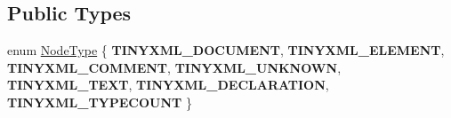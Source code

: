 \subsection*{Public Types}
\begin{DoxyCompactItemize}
\item 
enum \hyperlink{classTiXmlNode_a836eded4920ab9e9ef28496f48cd95a2}{Node\+Type} \{ \newline
{\bfseries T\+I\+N\+Y\+X\+M\+L\+\_\+\+D\+O\+C\+U\+M\+E\+NT}, 
{\bfseries T\+I\+N\+Y\+X\+M\+L\+\_\+\+E\+L\+E\+M\+E\+NT}, 
{\bfseries T\+I\+N\+Y\+X\+M\+L\+\_\+\+C\+O\+M\+M\+E\+NT}, 
{\bfseries T\+I\+N\+Y\+X\+M\+L\+\_\+\+U\+N\+K\+N\+O\+WN}, 
\newline
{\bfseries T\+I\+N\+Y\+X\+M\+L\+\_\+\+T\+E\+XT}, 
{\bfseries T\+I\+N\+Y\+X\+M\+L\+\_\+\+D\+E\+C\+L\+A\+R\+A\+T\+I\+ON}, 
{\bfseries T\+I\+N\+Y\+X\+M\+L\+\_\+\+T\+Y\+P\+E\+C\+O\+U\+NT}
 \}
\end{DoxyCompactItemize}
